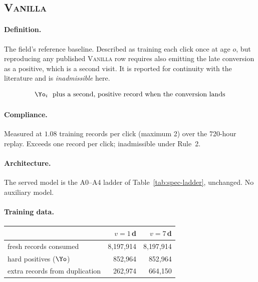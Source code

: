 \subsection{\textsc{Vanilla}}\label{app:m-Vanilla}

\paragraph{Definition.} The field's reference baseline. Described as training each click once at age $o$, but
   reproducing any published \textsc{Vanilla} row requires also emitting the late conversion as a
   positive, which is a second visit. It is reported for continuity with the literature and is
   \emph{inadmissible} here.

\begin{equation}
\Yo_i \ \text{ plus a second, positive record when the conversion lands}
\end{equation}

\begin{center}\end{center}

\paragraph{Compliance.} Measured at $1.08$ training records per click (maximum 2) over the 720-hour replay. Exceeds one record per click; inadmissible under Rule~2.

\paragraph{Architecture.} The served model is the A0--A4 ladder of Table~\ref{tab:spec-ladder}, unchanged. No auxiliary model.

\paragraph{Training data.}
\begin{center}\small\begin{tabular}{lrr}
\toprule
 & $v=1$\,d & $v=7$\,d\\
\midrule
fresh records consumed & 8{,}197{,}914 & 8{,}197{,}914\\
hard positives ($\Yo$) & 852{,}964 & 852{,}964\\
extra records from duplication & 262{,}974 & 664{,}150\\
\bottomrule
\end{tabular}\end{center}


